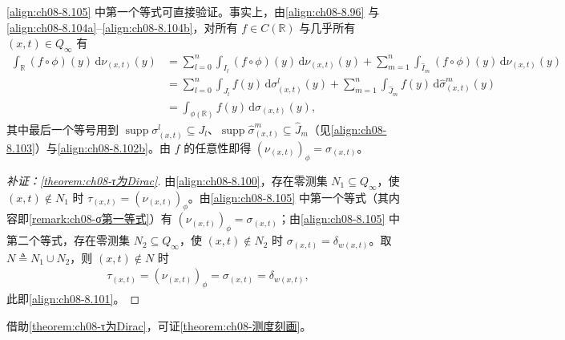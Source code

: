 \documentclass[../../main.tex]{subfiles}%
\begin{document}
\begin{remark}\label{remark:ch08-σ第一等式}
\eqref{align:ch08-8.105} 中第一个等式可直接验证。事实上，由\eqref{align:ch08-8.96} 与\eqref{align:ch08-8.104a}--\eqref{align:ch08-8.104b}，对所有 $f\in C(\mathbb{R})$ 与几乎所有 $(x,t)\in Q_\infty$ 有
\begin{align*}
\int_{\mathbb{R}}(f\circ\phi)(y)\,\mathrm{d}\nu_{(x,t)}(y)
&=\sum_{l=0}^n\int_{I_l}(f\circ\phi)(y)\,\mathrm{d}\nu_{(x,t)}(y)
+\sum_{m=1}^n\int_{\widehat I_m}(f\circ\phi)(y)\,\mathrm{d}\nu_{(x,t)}(y)\\
&=\sum_{l=0}^n\int_{J_l}f(y)\,\mathrm{d}\sigma^l_{(x,t)}(y)
+\sum_{m=1}^n\int_{\widehat J_m}f(y)\,\mathrm{d}\widehat\sigma^m_{(x,t)}(y)\\
&=\int_{\phi(\mathbb{R})}f(y)\,\mathrm{d}\sigma_{(x,t)}(y),
\end{align*}
其中最后一个等号用到 $\operatorname{supp}\sigma^l_{(x,t)}\subseteq J_l$、$\operatorname{supp}\widehat\sigma^m_{(x,t)}\subseteq\widehat J_m$（见\eqref{align:ch08-8.103}）与\eqref{align:ch08-8.102b}。由 $f$ 的任意性即得 $(\nu_{(x,t)})_\phi=\sigma_{(x,t)}$。
\end{remark}

\begin{proof}[补证：\cref{theorem:ch08-τ为Dirac}]
由\eqref{align:ch08-8.100}，存在零测集 $N_1\subseteq Q_\infty$，使 $(x,t)\notin N_1$ 时 $\tau_{(x,t)}=(\nu_{(x,t)})_\phi$。由\eqref{align:ch08-8.105} 中第一个等式（其内容即\cref{remark:ch08-σ第一等式}）有 $(\nu_{(x,t)})_\phi=\sigma_{(x,t)}$；由\eqref{align:ch08-8.105} 中第二个等式，存在零测集 $N_2\subseteq Q_\infty$，使 $(x,t)\notin N_2$ 时 $\sigma_{(x,t)}=\delta_{w(x,t)}$。取 $N\triangleq N_1\cup N_2$，则 $(x,t)\notin N$ 时
\begin{align*}
\tau_{(x,t)}=(\nu_{(x,t)})_\phi=\sigma_{(x,t)}=\delta_{w(x,t)},
\end{align*}
此即\eqref{align:ch08-8.101}。
\end{proof}

借助\cref{theorem:ch08-τ为Dirac}，可证\cref{theorem:ch08-测度刻画}。
\end{document}
